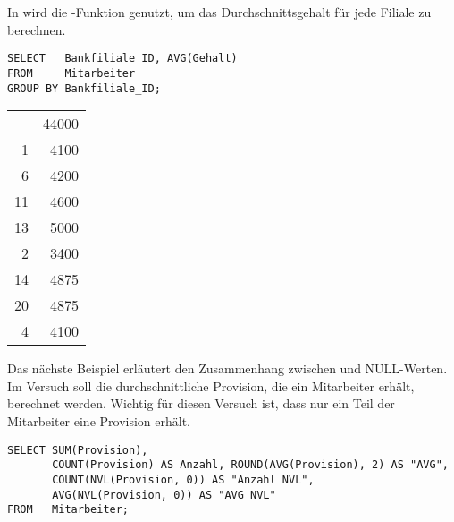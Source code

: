         In  wird die -Funktion genutzt, um das Durchschnittsgehalt für jede Filiale zu berechnen.
        \begin{lstlisting}[language=oracle_sql,caption={Die AVG-Funktion},label=sql05_08]
SELECT   Bankfiliale_ID, AVG(Gehalt)
FROM     Mitarbeiter
GROUP BY Bankfiliale_ID;
        \end{lstlisting}
        \begin{center}
          \begin{small}
            \tablehead{}
            \begin{msoraclesql}
              \begin{supertabular}{rr}
                & 44000 \\
                1 & 4100 \\
                6 & 4200 \\
                11 & 4600 \\
                13 & 5000 \\
                2 & 3400 \\
                14 & 4875 \\
                20 & 4875 \\
                4 & 4100 \\
              \end{supertabular}
            \end{msoraclesql}
          \end{small}
        \end{center}
		\clearpage
        Das nächste Beispiel erläutert den Zusammenhang zwischen  und NULL-Werten. Im Versuch soll die durchschnittliche Provision, die ein Mitarbeiter erhält, berechnet werden. Wichtig für diesen Versuch ist, dass nur ein Teil der Mitarbeiter eine Provision erhält.
        \begin{lstlisting}[language=oracle_sql,caption={AVG und NULL-Werte in Oracle},label=sql05_09]
SELECT SUM(Provision),
       COUNT(Provision) AS Anzahl, ROUND(AVG(Provision), 2) AS "AVG",
       COUNT(NVL(Provision, 0)) AS "Anzahl NVL",
       AVG(NVL(Provision, 0)) AS "AVG NVL"
FROM   Mitarbeiter;
        \end{lstlisting}
